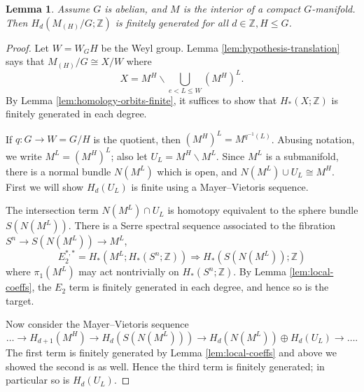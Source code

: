 \documentclass[11pt]{amsart}
\newtheorem{lemma}[equation]{Lemma}
\theoremstyle{definition}
\numberwithin{equation}{subsection} %
\newcommand{\Z}{\mathbb{Z}}
\begin{document}
\begin{lemma} \label{lem:fg-homology}
Assume $G$ is abelian, and $M$ is the interior of a compact $G$-manifold.
Then $H_d(M_{(H)}/G; \Z)$ is finitely generated for all $d\in \Z,H\leq G$.
\end{lemma}
\begin{proof}
Let $W = W_GH$ be the Weyl group.
Lemma \ref{lem:hypothesis-translation} says that $M_{(H)}/G \cong X/W$ where
\begin{equation}\label{eq:bigcupX} X = M^H \backslash \bigcup_{e < L\leq W} (M^H)^L.
\end{equation}
By Lemma \ref{lem:homology-orbits-finite}, it suffices to show that
$H_*(X;\Z)$ is finitely generated in each
degree.

If $q:G\to W = G/H$ is the quotient, then $(M^H)^L = M^{q^{-1}(L)}$.
Abusing notation, we write $M^L = (M^H)^L$; also let
$U_L = M^H \backslash M^L$.
Since $M^L$ is a submanifold, there is a normal bundle $N(M^L)$ which is open,
and $N(M^L) \cup U_L \cong M^H$.
First we will show $H_d(U_L)$ is finite using a Mayer--Vietoris sequence.

The intersection term $N(M^L)\cap U_L$ is homotopy equivalent to the sphere bundle $S(N(M^L))$. There
is a Serre spectral sequence associated to the fibration $S^n\to S(N(M^L))\to
M^L$,
$$ E_2^{*,*} = H_*(M^L; H_*(S^n; \Z))\Rightarrow H_*(S(N(M^L));\Z) $$
where $\pi_1(M^L)$ may act nontrivially on $H_*(S^n;\Z)$. By Lemma
\ref{lem:local-coeffs}, the $E_2$ term is finitely generated in each degree, and
hence so is the target.

Now consider the Mayer--Vietoris sequence
$$ \dots\to H_{d+1}(M^H)\to H_d(S(N(M^L))) \to H_d(N(M^L)) \oplus H_d(U_L)\to
\dots. $$
The first term is finitely generated by Lemma \ref{lem:local-coeffs} and above we showed the second is
as well. Hence the third term is finitely generated; in particular so is $H_d(U_L)$.


\end{proof}
\end{document}

